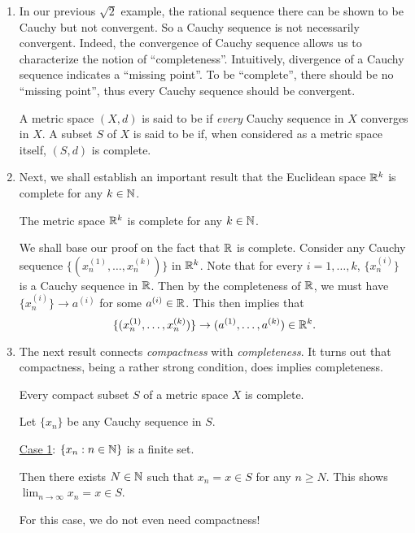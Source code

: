 \begin{enumerate}
\item In our previous \(\sqrt{2}\) example, the rational sequence there can be
shown to be Cauchy but not convergent. So a Cauchy sequence is not necessarily
convergent. Indeed, the convergence of Cauchy sequence allows us to
characterize the notion of ``completeness''. Intuitively, divergence of a
Cauchy sequence indicates a ``missing point''. To be ``complete'', there should
be no ``missing point'', thus every Cauchy sequence should be convergent.

A metric space \((X,d)\) is said to be  if \emph{every} Cauchy
sequence in \(X\) converges in \(X\). A subset \(S\) of \(X\) is said to be
 if, when considered as a metric space itself, \((S,d)\) is
complete.

\item Next, we shall establish an important result that the Euclidean space
\(\mathbb{R}^k\) is complete for any \(k\in\mathbb{N}\).

\begin{theorem}
\label{thm:rk-complete}
The metric space \(\mathbb{R}^k\) is complete for any \(k\in\mathbb{N}\).
\end{theorem}
\begin{pf}
We shall base our proof on the fact that \(\mathbb{R}\) is complete. Consider any
Cauchy sequence \(\{(x_n^{(1)},\dotsc,x_n^{(k)})\}\) in \(\mathbb{R}^k\). Note that for
every \(i=1,\dotsc,k\), \(\{x_n^{(i)}\}\) is a Cauchy sequence in \(\mathbb{R}\). Then
by the completeness of \(\mathbb{R}\), we must have \(\{x_n^{(i)}\}\to a^{(i)}\) for
some \(a^{(i)}\in\mathbb{R}\). This then implies that
\[
\{(x_n^{(1)},\dotsc,x_n^{(k)})\}\to (a^{(1)},\dotsc,a^{(k)})\in\mathbb{R}^k.
\]
\end{pf}

\item The next result connects \emph{compactness} with \emph{completeness}. It
turns out that compactness, being a rather strong condition, does implies
completeness.

\begin{theorem}
\label{thm:cpt-subset-comp}
Every compact subset \(S\) of a metric space \(X\) is complete.
\end{theorem}
\begin{pf}
Let \(\{x_n\}\) be any Cauchy sequence in \(S\).

\underline{Case 1}: \(\{x_n:n\in\mathbb{N}\}\) is a finite set.

Then there exists \(N\in\mathbb{N}\) such that \(x_n=x\in S\) for any \(n\ge N\). This
shows \(\lim_{n\to \infty}x_n=x\in S\).
\begin{note}
For this case, we do not even need compactness!
\end{note}


\end{pf}
\end{enumerate}

